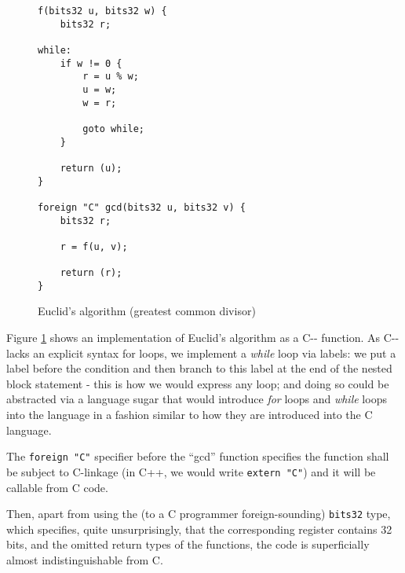 \documentclass[12pt,a4paper]{article}
\begin{document}
\pagebreak

\begin{figure}[!h]
	\caption{Euclid's algorithm (greatest common divisor)}
	\label{Cmm-figure}
	\begin{lstlisting}
f(bits32 u, bits32 w) {
	bits32 r;

while:
	if w != 0 {
		r = u % w;
		u = w;
		w = r;

		goto while;
	}

	return (u);
}

foreign "C" gcd(bits32 u, bits32 v) {
	bits32 r;

	r = f(u, v);

	return (r);
}

	\end{lstlisting}
\end{figure}

Figure \ref{Cmm-figure} shows an implementation of Euclid's algorithm as a C-{}- function. As C-{}- lacks an explicit syntax for loops, we implement a \textit{while} loop via labels: we put a label before the condition and then branch to this label at the end of the nested block statement - this is how we would express any loop; and doing so could be abstracted via a language sugar that would introduce \textit{for} loops and \textit{while} loops into the language in a fashion similar to how they are introduced into the C language.

The \lstinline{foreign "C"} specifier before the ``gcd'' function specifies the function shall be subject to C-linkage (in C++, we would write \lstinline{extern "C"}) and it will be callable from C code.

Then, apart from using the (to a C programmer foreign-sounding) \lstinline{bits32} type, which specifies, quite unsurprisingly, that the corresponding register contains 32 bits, and the omitted return types of the functions, the code is superficially almost indistinguishable from C.
\end{document}
